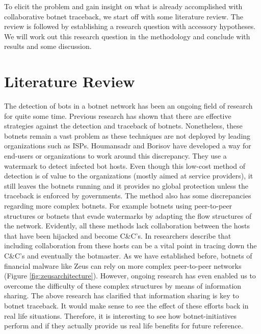 \documentclass{sig-alternate-br}
\begin{document}
To elicit the problem and gain insight on what is already accomplished with collaborative botnet traceback, we start off with some literature review. The review is followed by establishing a research question with accessory hypotheses. We will work out this research question in the methodology and conclude with results and some discussion.

\section{Literature Review}
The detection of bots in a botnet network has been an ongoing field of research for quite some time. Previous research\cite{Keisuke2009400,Zhaosheng2008967} has shown that there are effective strategies against the detection and traceback of botnets. Nonetheless, these botnets remain a vast problem as these techniques are not deployed by leading organizations such as ISPs. Houmansadr and Borisov\cite{Houmansadr2013707} have developed a way for end-users or organizations to work around this discrepancy. They use a watermark to detect infected bot hosts. Even though this low-cost method of detection is of value to the organizations (mostly aimed at service providers), it still leaves the botnets running and it provides no global protection unless the traceback is enforced by governments. The method also has some discrepancies regarding more complex botnets. For example botnets using peer-to-peer structures or botnets that evade watermarks by adapting the flow structures of the network.
Evidently, all these methods lack collaboration between the hosts that have been hijacked and become C\&C's. In \cite{Mizoguchi2011639} researchers describe that including collaboration from these hosts can be a vital point in tracing down the C\&C's and eventually the botmaster. As we have established before, botnets of financial malware like Zeus can rely on more complex peer-to-peer networks (Figure \ref{fig:zeusarchitecture}). However, ongoing research has even enabled us to overcome the difficulty of these complex structures by means of information sharing\cite{Wang2014132}. The above research has clarified that information sharing is key to botnet traceback. It would make sense to see the effect of these efforts back in real life situations. Therefore, it is interesting to see how botnet-initiatives perform and if they actually provide us real life benefits for future reference. 
\end{document}
